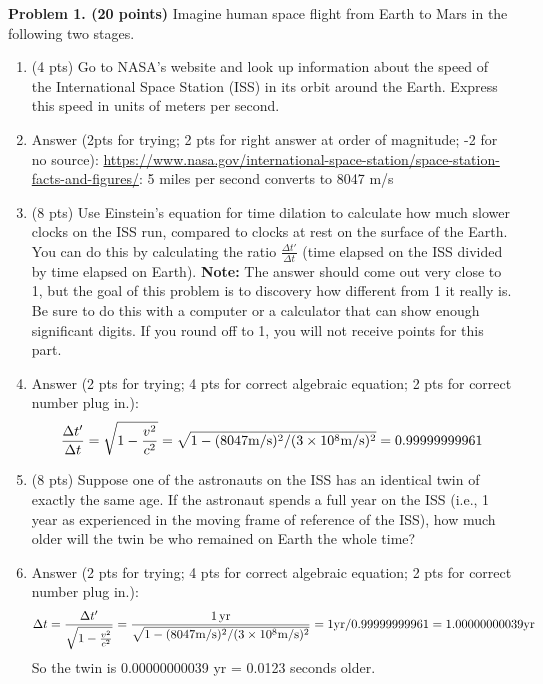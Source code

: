 \documentclass[12pt]{article}
\begin{document}
\newpage
\vspace{10pt}
\noindent \textbf{Problem 1. (20 points)} Imagine human space flight from Earth
to Mars in the following two stages.

\begin{enumerate}
    \item (4 pts) Go to NASA's website and look up information about the speed
    of the International Space Station (ISS) in its orbit around the Earth.
    Express this speed in units of meters per second.

    \item Answer (2pts for trying; 2 pts for right answer at order of magnitude; -2 for no source):
    \href{https://www.nasa.gov/international-space-station/space-station-facts-and-figures/}{https://www.nasa.gov/international-space-station/space-station-facts-and-figures/}:
    5 miles per second converts to 8047 m/s 


    \item (8 pts) Use Einstein's equation for time dilation to calculate how
    much slower clocks on the ISS run, compared to clocks at rest on the surface
    of the Earth. You can do this by calculating the ratio $\frac{\Delta
    t'}{\Delta t}$ (time elapsed on the ISS divided by time elapsed on Earth).
    \textbf{Note:} The answer should come out very close to 1, but the goal of
    this problem is to discovery how different from 1 it really is. Be sure to
    do this with a computer or a calculator that can show enough significant
    digits. If you round off to 1, you will not receive points for this part. 

    \item Answer (2 pts for trying; 4 pts for correct algebraic equation; 2 pts for correct number plug in.): \[
        \frac{\Delta t'}{\Delta t} = \sqrt{1 - \frac{v^2}{c^2}} = \sqrt{1-(8047 \rm{m/s})^2/(3\times10^8 \rm{m/s})^2 } = 0.99999999961
           \]

    \item (8 pts) Suppose one of the astronauts on the ISS has an identical twin
    of exactly the same age. If the astronaut spends a full year on the ISS
    (i.e., 1 year as experienced in the moving frame of reference of the ISS),
    how much older will the twin be who remained on Earth the whole time? 

    \item Answer (2 pts for trying; 4 pts for correct algebraic equation; 2 pts for correct number plug in.): \[\Delta t = \frac{\Delta t'}{\sqrt{1 - \frac{v^2}{c^2}}} = \frac{1\,\rm{yr}}{\sqrt{1-(8047 \rm{m/s})^2/(3\times10^8 \rm{m/s})^2 }} = 1 \rm{yr} /0.99999999961 = 1.00000000039 \rm{yr} \] So the twin is 0.00000000039 yr = 0.0123 seconds older. 
\end{enumerate}
\end{document}
